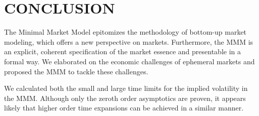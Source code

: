 \documentclass[a4 paper, 12pt]{report}
\theoremstyle{plain}
\begin{document}
\chapter{CONCLUSION}
\noindent


\par The Minimal Market Model epitomizes the methodology of bottom-up
market modeling, which offers a new perspective on markets. Furthermore,
the MMM is an explicit, coherent specification of the market essence and
presentable in a formal way. We elaborated on the economic challenges of
ephemeral markets and proposed the MMM to tackle these challenges.\\

\par We calculated both the small and large time limits for the implied volatility in the MMM. Although only the zeroth order asymptotics are proven, it appears likely that higher order time expansions can be achieved in a similar manner.
\end{document}
